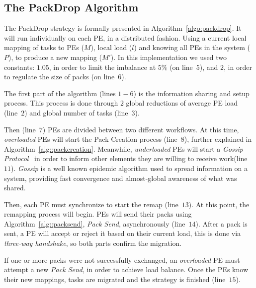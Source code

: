 \subsection{The PackDrop Algorithm}

The PackDrop strategy is formally presented in Algorithm~\ref{algo:packdrop}. 
It will run individually on each PE, in a distributed fashion. 
Using a current local mapping of tasks to PEs ($  M$), local load ($l$) and knowing all PEs in the system ($  P$), to produce a new mapping ($  M'$).
In this implementation we used two constants: $1.05$, in order to limit the imbalance at $5\%$ (on line~$5$), and $2$, in order to regulate the size of packs (on line~$6$).

The first part of the algorithm (lines $1-6$) is the information sharing and setup process. 
This process is done through $2$ global reductions of average PE load (line~$2$) and global number of tasks (line~$3$).

Then (line~$7$) PEs are divided between two different workflows.
At this time, \textit{overloaded} PEs will start the Pack Creation process (line~$8$), further explained in Algorithm~\ref{alg::packcreation}.
Meanwhile, \textit{underloaded} PEs will start a \textit{Gossip Protocol}~\cite{gossip} in order to inform other elements they are willing to receive work(line~$11$).
\textit{Gossip} is a well known epidemic algorithm used to spread information on a system, providing fast convergence and almost-global awareness of what was shared.

Then, each PE must synchronize to start the remap (line~$13$). 
At this point, the remapping process will begin.
PEs will send their packs using Algorithm~\ref{alg::packsend}, \textit{Pack Send}, asynchronously (line~$14$).
After a pack is sent, a PE will accept or reject it based on their current load, this is done via \textit{three-way handshake}, so both parts confirm the migration.

If one or more packs were not successfully exchanged, an \textit{overloaded} PE must attempt a new \textit{Pack Send}, in order to achieve load balance.
Once the PEs know their new mappings, tasks are migrated and the strategy is finished (line~$15$). 

